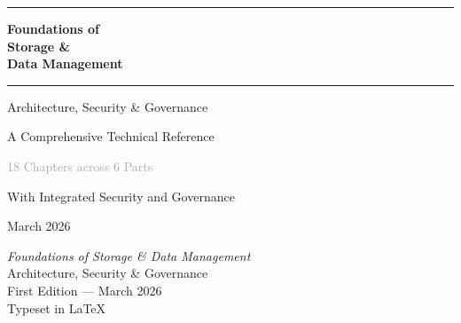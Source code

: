 \documentclass[10pt,twoside,openright]{book}
\begin{document}
\frontmatter
\pagestyle{plain}

\begin{titlepage}
\begin{center}
\vspace*{1.5cm}

{\textcolor{accentblue}{\rule{8cm}{1.5pt}}}

\vspace{0.8cm}

{\fontsize{32}{38}\selectfont\bfseries\sffamily\textcolor{chapterblue}{Foundations of\\[6pt] Storage \&\\[6pt] Data Management}}

\vspace{0.6cm}

{\textcolor{accentblue}{\rule{8cm}{1.5pt}}}

\vspace{1cm}

{\Large\sffamily\textcolor{midgray}{Architecture, Security \& Governance}}

\vspace{0.5cm}

{\large\sffamily\textcolor{midgray}{A Comprehensive Technical Reference}}

\vspace{2cm}

{\large\sffamily\textcolor{darkgray}{18 Chapters across 6 Parts}}

\vspace{0.3cm}

{\normalsize\sffamily\textcolor{midgray}{With Integrated Security and Governance}}

\vspace{\fill}

{\normalsize\sffamily\textcolor{midgray}{March 2026}}

\end{center}
\end{titlepage}

\cleardoublepage

\thispagestyle{empty}
\vspace*{\fill}
\begin{center}
\small\sffamily\textcolor{midgray}{%
\textit{Foundations of Storage \& Data Management}\\[4pt]
Architecture, Security \& Governance\\[12pt]
First Edition --- March 2026\\[24pt]
Typeset in \LaTeX\\[4pt]
}
\end{center}
\vspace*{\fill}
\cleardoublepage
\end{document}
